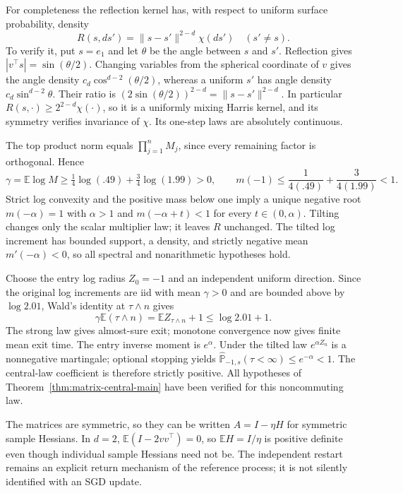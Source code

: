 For completeness the reflection kernel has, with respect to uniform
surface probability, density
\begin{equation}
 R(s,ds')=\|s-s'\|^{2-d}\chi(ds')\quad(s'\ne s).
 \label{eq:reflection-angular-density}
\end{equation}
To verify it, put $s=e_1$ and let $\theta$ be the angle between $s$ and
$s'$. Reflection gives $|v^\top s|=\sin(\theta/2)$.
Changing variables from the spherical coordinate of $v$ gives
the angle density $c_d\cos^{d-2}(\theta/2)$, whereas a uniform
$s'$ has angle density $c_d\sin^{d-2}\theta$. Their ratio is
$(2\sin(\theta/2))^{2-d}=\|s-s'\|^{2-d}$.
In particular $R(s,\cdot)\ge2^{2-d}\chi(\cdot)$, so it is a
uniformly mixing Harris kernel, and its symmetry verifies invariance
of $\chi$. Its one-step laws are absolutely continuous.

The top product norm equals $\prod_{j=1}^n M_j$, since every remaining
factor is orthogonal. Hence
\[
 \gamma=\mathbb E\log M
 \ge\tfrac14\log(.49)+\tfrac34\log(1.99)>0,
 \qquad
 m(-1)\le\frac{1}{4(.49)}+\frac{3}{4(1.99)}<1.
\]
Strict log convexity and the positive mass below one imply a unique
negative root $m(-\alpha)=1$ with $\alpha>1$ and
$m(-\alpha+t)<1$ for every $t\in(0,\alpha)$.
Tilting changes only the scalar multiplier law; it leaves $R$
unchanged. The tilted log increment has bounded support, a density,
and strictly negative mean $m'(-\alpha)<0$, so all spectral and
nonarithmetic hypotheses hold.

Choose the entry log radius $Z_0=-1$ and an independent uniform
direction. Since the original log increments are iid with mean
$\gamma>0$ and are bounded above by $\log2.01$, Wald's identity at
$\tau\wedge n$ gives
\[
 \gamma\mathbb E(\tau\wedge n)
   =\mathbb EZ_{\tau\wedge n}+1
   \le\log2.01+1.
\]
The strong law gives almost-sure exit; monotone convergence now gives
finite mean exit time. The entry inverse moment is $e^\alpha$.
Under the tilted law $e^{\alpha Z_n}$ is a nonnegative martingale;
optional stopping yields
$\widehat{\mathbb P}_{-1,s}(\tau<\infty)\le e^{-\alpha}<1$.
The central-law coefficient is therefore strictly positive.
All hypotheses of Theorem~\ref{thm:matrix-central-main} have been
verified for this noncommuting law.

The matrices are symmetric, so they can be written
$A=I-\eta H$ for symmetric sample Hessians. In $d=2$,
$\mathbb E(I-2vv^\top)=0$, so $\mathbb EH=I/\eta$ is positive
definite even though individual sample Hessians need not be. The
independent restart remains an explicit return mechanism of the
reference process; it is not silently identified with an SGD update.

